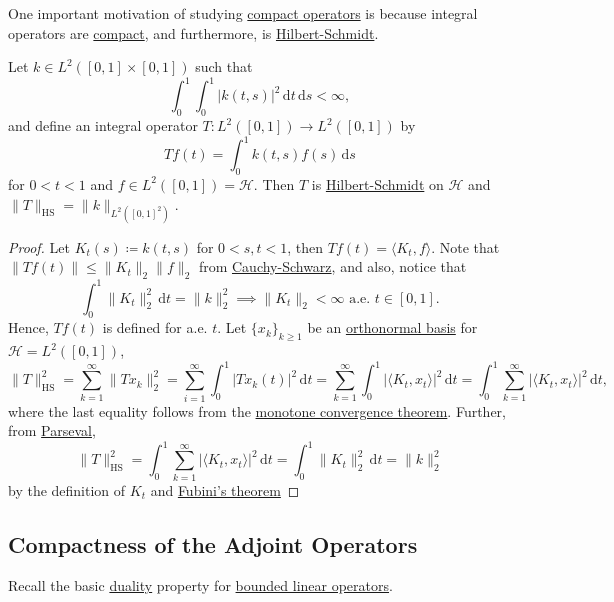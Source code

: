 One important motivation of studying \hyperref[def:compact-op]{compact operators} is because integral operators are \hyperref[def:compact-op]{compact}, and furthermore, is \hyperref[def:Hilbert-Schmidt-op]{Hilbert-Schmidt}.

\begin{proposition}\label{prop:Hilbert-Schmidt-integral-op}
	Let \(k\in L^2([0, 1]\times [0, 1])\) such that
	\[
		\int _0^1 \int _0^1 \vert k(t, s) \vert ^{2} \,\mathrm{d} t\,\mathrm{d} s < \infty,
	\]
	and define an integral operator \(T\colon L^2([0, 1])\to L^2([0, 1])\) by
	\[
		Tf(t) = \int _0^1 k(t, s)f(s)\,\mathrm{d} s
	\]
	for \(0 < t < 1\) and \(f\in L^2([0, 1])= \mathcal{H} \). Then \(T\) is \hyperref[def:Hilbert-Schmidt-op]{Hilbert-Schmidt} on \(\mathcal{H} \) and \(\lVert T \rVert _{\mathrm{HS} }= \lVert k \rVert _{L^2([0, 1]^2)}\).
\end{proposition}
\begin{proof}
	Let \(K_t(s) \coloneqq k(t, s)\) for \(0<s, t<1\), then \(Tf(t) = \langle K_t, f \rangle \). Note that \(\lVert Tf(t) \rVert \leq \lVert K_t \rVert _2 \lVert f \rVert _2\) from \hyperref[thm:Cauchy-Schwarz-ineq]{Cauchy-Schwarz}, and also, notice that
	\[
		\int_{0}^{1} \lVert K_t \rVert ^2_2 \,\mathrm{d}t
		= \lVert k \rVert _2^2
		\implies \lVert K_t \rVert _2<\infty \text{ a.e. }t\in [0,1].
	\]
	Hence, \(Tf(t)\) is defined for a.e. \(t\). Let \(\{ x_k \} _{k \geq 1}\) be an \hyperref[def:orthonormal-basis]{orthonormal basis} for \(\mathcal{H} =L^2([0, 1])\),
	\[
		\lVert T \rVert ^2 _{\mathrm{HS} }
		= \sum_{k=1}^{\infty} \lVert T x_{k} \rVert _2^2
		= \sum_{i=1}^{\infty} \int _0^1 \vert T x_{k} (t) \vert ^2 \,\mathrm{d} t
		= \sum_{k=1}^{\infty} \int _0^1 \vert \langle K_{t} , x_{t} \rangle \vert ^2 \,\mathrm{d} t
		= \int _0^1 \sum_{k=1}^{\infty}\vert \langle K_{t} , x_{t} \rangle \vert ^2 \,\mathrm{d} t ,
	\]
	where the last equality follows from the \href{https://en.wikipedia.org/wiki/Monotone_convergence_theorem}{monotone convergence theorem}. Further, from \hyperref[col:Parseval]{Parseval},
	\[
		\lVert T \rVert ^2 _{\mathrm{HS} }
		= \int _0^1 \sum_{k=1}^{\infty}\vert \langle K_{t} , x_{t} \rangle \vert ^2 \,\mathrm{d} t
		= \int _0^1 \lVert K_t \rVert _2^2 \,\mathrm{d} t
		= \lVert k \rVert _2^2
	\]
	by the definition of \(K_t\) and \href{https://en.wikipedia.org/wiki/Fubini's_theorem}{Fubini's theorem}
\end{proof}

\subsection{Compactness of the Adjoint Operators}
Recall the basic \hyperref[def:dual-space]{duality} property for \hyperref[def:bounded-linear-op]{bounded linear operators}.

